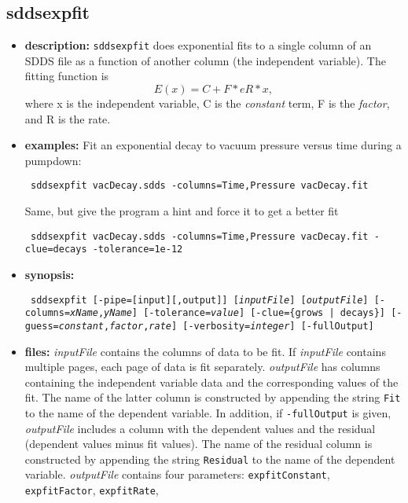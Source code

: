\begin{latexonly}
\newpage
\end{latexonly}
\subsection{sddsexpfit}
\label{sddsexpfit}

\begin{itemize}
\item {\bf description:}
{\tt sddsexpfit} does exponential fits to a single column of an SDDS file as a function of another column (the independent 
variable).  The fitting function is
\[ E(x) = C + F * e {R*x}, \]
where x is the independent variable, C is the {\em constant} term, F is the {\em factor}, and R is the {\rm rate}.
\item {\bf examples:} 
Fit an  exponential decay to vacuum pressure versus time during a pumpdown:
\begin{flushleft}{\tt
sddsexpfit vacDecay.sdds -columns=Time,Pressure vacDecay.fit
}\end{flushleft}
Same, but give the program a hint and force it to get a better fit
\begin{flushleft}{\tt
sddsexpfit vacDecay.sdds -columns=Time,Pressure vacDecay.fit -clue=decays -tolerance=1e-12
}\end{flushleft}
\item {\bf synopsis:} 
\begin{flushleft}{\tt
sddsexpfit [-pipe=[input][,output]] [{\em inputFile}] [{\em outputFile}]
[-columns={\em xName},{\em yName}] [-tolerance={\em value}] 
[-clue=\{grows | decays\}] [-guess={\em constant},{\em factor},{\em rate}] 
[-verbosity={\em integer}] [-fullOutput] 
}\end{flushleft}
\item {\bf files:}
{\em inputFile} contains the columns of data to be fit.  If {\em inputFile} contains multiple
pages, each page of data is fit separately.  {\em outputFile} has columns containing the
independent variable data and the corresponding values of the fit.  The name of the latter
column is constructed by appending the string {\tt Fit} to the name of the dependent variable.
In addition, if {\tt -fullOutput} is given, {\em outputFile} includes a column with the dependent values and
the residual (dependent values minus fit values).  The name of the residual column is
constructed by appending the string {\tt Residual} to the name of the dependent variable.  {\em
outputFile} contains four parameters: {\tt expfitConstant}, {\tt expfitFactor}, {\tt expfitRate},

\end{itemize}

